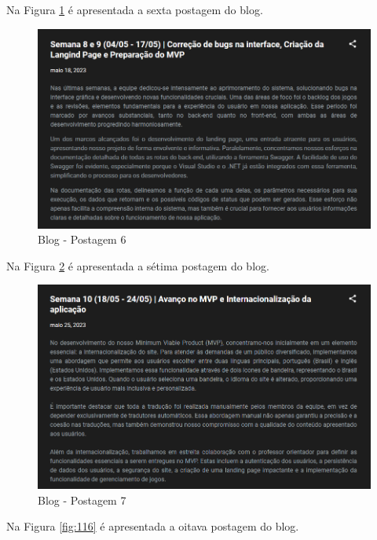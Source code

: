 \begin{apendicesenv}
Na Figura \ref{fig:114} é apresentada a sexta postagem do blog.

\begin{figure}[H]
	\centering
	\includegraphics[scale=0.68]{./imagens/Blog6.png}
	\caption{Blog - Postagem 6}
    \label{fig:114}
\end{figure}
\pagebreak

Na Figura \ref{fig:115} é apresentada a sétima postagem do blog.

\begin{figure}[H]
	\centering
	\includegraphics[scale=0.68]{./imagens/Blog7.png}
	\caption{Blog - Postagem 7}
    \label{fig:115}
\end{figure}
\pagebreak

Na Figura \ref{fig:116} é apresentada a oitava postagem do blog.


\end{apendicesenv}

